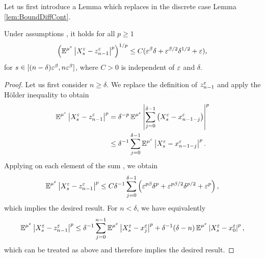 \documentclass[10pt]{article}
\begin{document}
Let us first introduce a Lemma which replaces in the discrete case Lemma \ref{lem:BoundDiffCont}.
\begin{lemma}\label{lem:BoundDiff} Under assumptions , it holds for all $p \geq 1$ 
	\begin{equation}
		\left(\operatorname{\mathbb{E}}^{\mu^\varepsilon}\left\lvert X_s^\varepsilon - z^\varepsilon_{n-1}\right\rvert^p\right)^{1/p} \leq C(\varepsilon^\beta\delta + \varepsilon^{\beta/2}\delta^{1/2} + \varepsilon),
	\end{equation}
	for $s \in [(n-\delta)\varepsilon^\beta, n\varepsilon^\beta]$, where $C > 0$ is independent of $\varepsilon$ and $\delta$.
\end{lemma}
\begin{proof} Let us first consider $n \geq \delta$. We replace the definition of $z^\varepsilon_{n-1}$ and apply the Hölder inequality to obtain
	\begin{equation}
	\begin{aligned}
		\operatorname{\mathbb{E}}^{\mu^\varepsilon}\left\lvert X_s^\varepsilon - z^\varepsilon_{n-1}\right\rvert^p &= \delta^{-p} \operatorname{\mathbb{E}}^{\mu^\varepsilon} \left\lvert\sum_{j=0}^{\delta-1}\left(X_s^\varepsilon - x^\varepsilon_{n-1-j}\right)\right\rvert^p \\
		&\leq \delta^{-1}\sum_{j=0}^{\delta-1} \operatorname{\mathbb{E}}^{\mu^\varepsilon}\left\lvert X_s^\varepsilon - x^\varepsilon_{n-1-j}\right\rvert^p.
	\end{aligned}
	\end{equation}
	Applying on each element of the sum \cite[Lemma 6.1]{PaS07}, we obtain
	\begin{equation}
		\operatorname{\mathbb{E}}^{\mu^\varepsilon}\left\lvert X_s^\varepsilon - z^\varepsilon_{n-1}\right\rvert^p \leq C \delta^{-1} \sum_{j=0}^{\delta-1} \left(\varepsilon^{p\beta}\delta^p + \varepsilon^{p\beta/2}\delta^{p/2} + \varepsilon^p\right),
	\end{equation}
	which implies the desired result. For $n < \delta$, we have equivalently
	\begin{equation}
		\operatorname{\mathbb{E}}^{\mu^\varepsilon}\left\lvert X_s^\varepsilon - z^\varepsilon_{n-1}\right\rvert^p \leq \delta^{-1}\sum_{j=0}^{n-1}\operatorname{\mathbb{E}}^{\mu^\varepsilon}\left\lvert X_s^\varepsilon - x^\varepsilon_j\right\rvert^p + \delta^{-1}(\delta - n)\operatorname{\mathbb{E}}^{\mu^\varepsilon}\left\lvert X_s^\varepsilon - x^\varepsilon_0\right\rvert^p,
	\end{equation}
	which can be treated as above and therefore implies the desired result.
\end{proof}
\end{document}
